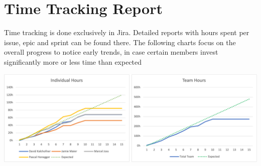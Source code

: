 \chapter{Time Tracking Report}

Time tracking is done exclusively in Jira.
Detailed reports with hours spent per issue, epic and sprint can be found there.
The following charts focus on the overall progress to notice early trends, in case certain members invest significantly more or less time than expected

\noindent\includegraphics[width=\textwidth]{resources/time-tracking-report}

